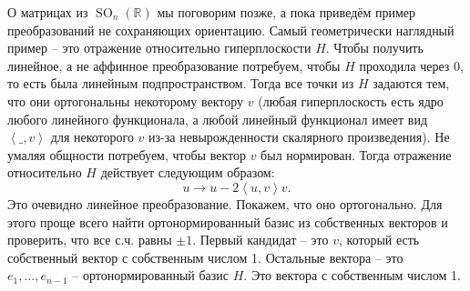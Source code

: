 \documentclass[10pt,a4paper,oneside]{book} %
\theoremstyle{definition}
\newcommand{\mb}[1]{\mathbb{#1}}
\newcommand{\SO}{\operatorname{SO}}
\def\lan{\left\langle }
\def\ran{\right\rangle}
\begin{document}
О матрицах из $\SO_n(\mb R)$ мы поговорим позже, а пока приведём пример преобразований не сохраняющих ориентацию. Самый геометрически наглядный пример -- это отражение относительно гиперплоскости $H$. Чтобы получить линейное, а не аффинное преобразование потребуем, чтобы $H$ проходила через 0, то есть была линейным подпространством. Тогда все точки из $H$ задаются тем, что они ортогональны некоторому вектору $v$ (любая гиперплоскость есть ядро любого линейного функционала, а любой линейный функционал имеет вид $\lan \_ ,v \ran$ для некоторого $v$ из-за невырожденности скалярного произведения). Не умаляя общности потребуем, чтобы вектор $v$ был нормирован. Тогда отражение относительно $H$ действует следующим образом:
$$u \to u - 2 \lan u,v\ran v.$$
Это очевидно линейное преобразование. Покажем, что оно ортогонально. Для этого проще всего найти ортонормированный базис из собственных векторов и проверить, что все с.ч. равны $\pm 1$. Первый кандидат -- это $v$, который есть собственный вектор с собственным числом 1. Остальные вектора -- это $e_1,\dots, e_{n-1}$ -- ортонормированный базис $H$. Это вектора с собственным числом 1. 
\end{document}
